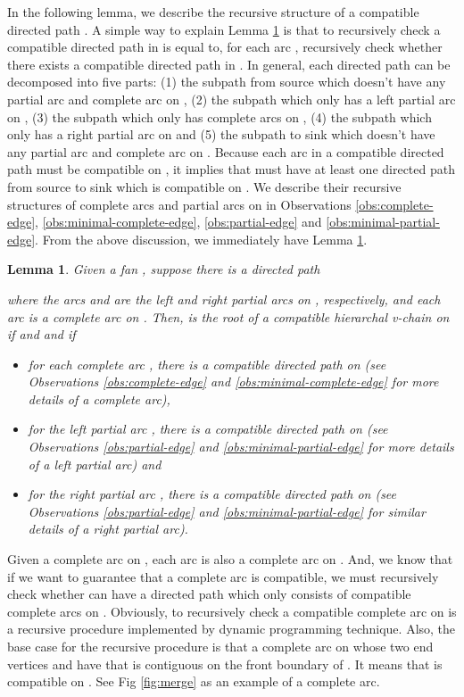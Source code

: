\documentclass[11pt]{article}
\newtheorem{lemma}[figure]{Lemma}
\begin{document}
In the following lemma,
we describe the recursive structure of a compatible directed path .
A simple way to explain Lemma \ref{lemma:proper-chain} is that
to recursively check a compatible directed path  in 
is equal to,
for each arc ,
recursively check whether there exists a compatible directed path  in .
In general, each directed path  can be decomposed into five parts:
(1) the subpath from source which doesn't have any partial arc and complete arc on ,
(2) the subpath which only has a left partial arc on ,
(3) the subpath which only has complete arcs on ,
(4) the subpath which only has a right partial arc on  and
(5) the subpath to sink which doesn't have any partial arc and complete arc on .
Because each arc  in a compatible directed path 
must be compatible on  ,
it implies that
 must have at least one directed path from source to sink which is compatible on .
We describe their recursive structures of complete arcs and partial arcs on  in Observations
\ref{obs:complete-edge}, \ref{obs:minimal-complete-edge}, \ref{obs:partial-edge} and \ref{obs:minimal-partial-edge}.
From the above discussion, we immediately have Lemma \ref{lemma:proper-chain}.

\begin{lemma}\label{lemma:proper-chain}
Given a fan ,
suppose there is a directed path
  

where the arcs  and  are the left and right partial arcs on , respectively, and
each arc  is a complete arc on .
Then,  is the root  of a compatible hierarchal v-chain  on  if and and if
\begin{itemize}
\item for each complete arc ,
there is a compatible directed path  on 
(see Observations \ref{obs:complete-edge} and \ref{obs:minimal-complete-edge}
for more details of a complete arc),
\item for the left partial arc ,
there is a compatible directed path  on 
(see Observations \ref{obs:partial-edge} and \ref{obs:minimal-partial-edge}
for more details of a left partial arc) and
\item for the right partial arc ,
there is a compatible directed path  on 
(see Observations \ref{obs:partial-edge} and \ref{obs:minimal-partial-edge}
for similar details of a right partial arc).
\end{itemize}
\end{lemma}


Given a complete arc  on ,
each arc  is also a complete arc on .
And, we know that if we want to guarantee that a complete arc  is compatible, we
must recursively check whether  can have a directed path which only consists of
compatible complete arcs on .
Obviously, to recursively check a compatible complete arc on 
is a recursive procedure implemented by dynamic programming technique.
Also, the base case for the recursive procedure
is that a complete arc on  whose two end vertices  and 
have that  is contiguous on the front boundary of . It means that
 is compatible on .
See Fig \ref{fig:merge} as an example of a complete arc.
\end{document}
